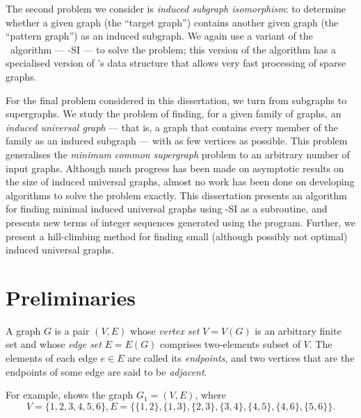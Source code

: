 The second problem we consider is \emph{induced subgraph isomorphism}: to determine
whether a given graph (the ``target graph'') contains another given graph (the ``pattern graph'')
as an induced subgraph.  We again use a variant of the \McSplit\ algorithm ---
\McSplit-SI --- to solve the problem; this version of the algorithm has a specialised
version of \McSplit's data structure that allows very fast processing of sparse graphs.

For the final problem considered in this dissertation, we turn from subgraphs
to supergraphs.  We study the problem of finding, for a given family of graphs,
an \textit{induced universal graph} --- that is, a graph that contains every
member of the family as an induced subgraph --- with as few vertices as
possible.  This problem generalises the \textit{minimum common supergraph}
problem to an arbitrary number of input graphs.  Although much progress has
been made on asymptotic results on the size of induced universal graphs, almost no
work has been done on developing algorithms to solve the problem exactly.  This
dissertation presents an algorithm for finding minimal induced universal graphs
using \McSplit-SI as a subroutine, and presents new terms of integer sequences
generated using the program.  Further, we present a hill-climbing method for
finding small (although possibly not optimal) induced universal graphs.

\section{Preliminaries}

A graph $G$ is a pair $(V, E)$ whose \emph{vertex set} $V = V(G)$
is an arbitrary finite set and whose \emph{edge set} $E = E(G)$
comprises two-elements subset of $V$. The elements of each edge
$e \in E$ are called its \emph{endpoints}, and two vertices that
are the endpoints of some edge are said to be \emph{adjacent}.

For example,  shows the graph $G_1 = (V,E)$, where
\[
V = \{1, 2, 3, 4, 5, 6\},
E = \{\{1,2\}, \{1,3\}, \{2,3\}, \{3,4\}, \{4,5\}, \{4,6\}, \{5,6\}\}
.
\]

